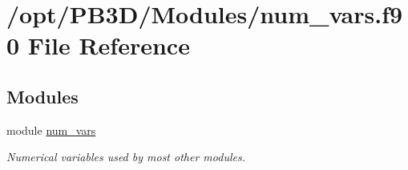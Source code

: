\hypertarget{num__vars_8f90}{}\section{/opt/\+P\+B3\+D/\+Modules/num\+\_\+vars.f90 File Reference}
\label{num__vars_8f90}
\subsection*{Modules}
\begin{DoxyCompactItemize}
\item 
module \hyperlink{namespacenum__vars}{num\+\_\+vars}
\begin{DoxyCompactList}\small\item\em Numerical variables used by most other modules. \end{DoxyCompactList}\end{DoxyCompactItemize}
